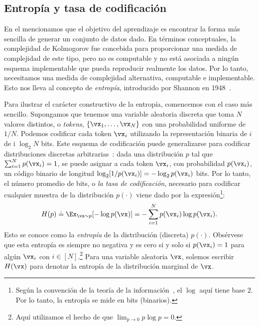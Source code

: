 \documentclass[../../book-main.tex]{subfiles}
\begin{document}
\subsection{Entropía y tasa de codificación}
En el  mencionamos que el objetivo del aprendizaje es
encontrar la forma más sencilla de generar un conjunto de datos dado. En términos conceptuales,
la complejidad de Kolmogorov fue concebida para proporcionar una medida de
complejidad de este tipo, pero no es computable y no está asociada a ningún
esquema implementable que pueda reproducir realmente los datos. Por lo tanto,
necesitamos una medida de complejidad alternativa, computable e implementable.
Esto nos lleva al concepto de \textit{entropía},
introducido por Shannon en 1948~\cite{Shannon-1948}.

Para ilustrar el carácter constructivo de la entropía, comencemos con
el caso más sencillo. Supongamos que tenemos una variable aleatoria discreta
que toma \(N\) valores distintos, o \textit{tokens}, \(\{\vx_{1},
\dots, \vx_{N}\}\) con una probabilidad uniforme de \(1/N\). Podemos
codificar cada token \(\vx_{i}\) utilizando la representación binaria de \(i\) de i
\(\log_{2} N\) bits. Este esquema de codificación puede generalizarse para
codificar distribuciones discretas arbitrarias~\cite{Cover-Thomas}: dada
una distribución \(p\) tal que \(\sum_{i=1}^{N} p(\vx_{i}) = 1\), se
puede asignar a cada token \(\vx_{i}\), con probabilidad \(p(\vx_{i})\),
un código binario de longitud \(\log_{2} [1/p(\vx_{i})] = - \log_{2}
p(\vx_{i})\) bits. Por lo tanto, el número promedio de bits, o \textit{la
tasa de codificación}, necesario para codificar cualquier muestra de la distribución
\(p(\cdot)\) viene dado por la expresión\footnote{Según la convención
    de la teoría de la información~\cite{Cover-Thomas}, el \(\log\) aquí tiene
base \(2\). Por lo tanto, la entropía se mide en bits (binarios).}:
\begin{equation}
    H(p) \doteq \Ex_{\vx \sim p}[-\log p(\vx)] = - \sum_{i=1}^{N}
    p(\vx_{i}) \log p(\vx_{i}).
    \label{eqn:entropy-discrete}
\end{equation}
Esto se conoce como la \textit{entropía} de la distribución (discreta)
\(p(\cdot)\). Obsérvese que esta entropía es siempre no negativa y es
cero si y solo si \(p(\vx_{i}) = 1\) para algún \(\vx_{i}\) con \(i
\in [N]\).\footnote{Aquí utilizamos el hecho de que
\(\lim_{p \to 0} p \log p = 0\).} Para una variable aleatoria
\(\vx\), solemos escribir \(H(\vx)\) para denotar la entropía de la
distribución marginal de \(\vx\).
\end{document}
